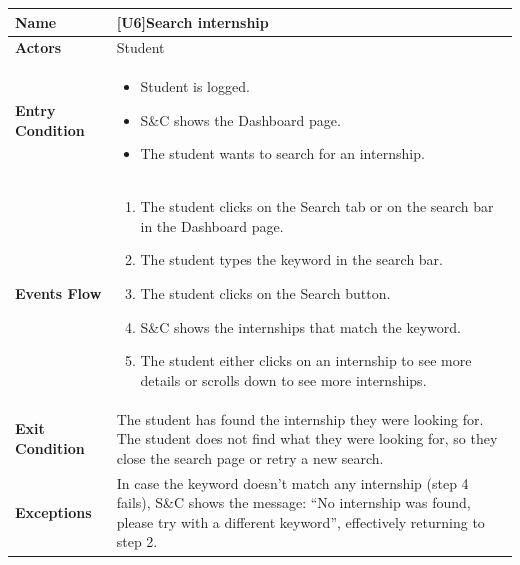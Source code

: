\begin{center}
    \begin{tabular}{|p{9em}|p{27em}|}
        \hline
        \rowcolor{bluepoli!40} %
        \textbf{Name} & \textbf{[U6]Search internship} \\
        \hline
        \textbf{Actors} & Student \\
        \hline
        \textbf{Entry Condition} &  
        \begin{itemize}
            \item Student is logged.
            \item S\&C shows the Dashboard page.
            \item The student wants to search for an internship.
        \end{itemize} \\
        \hline
        \textbf{Events Flow} & 
        \begin{enumerate}
            \item The student clicks on the Search tab or on the search bar in the Dashboard page.
            \item The student types the keyword in the search bar.
            \item The student clicks on the Search button.
            \item S\&C shows the internships that match the keyword.
            \item The student either clicks on an internship to see more details or scrolls down to see more internships.
        \end{enumerate} \\
        \hline
        \textbf{Exit Condition} & The student has found the internship they were looking for. The student does not find what they were looking for,
        so they close the search page or retry a new search. \\
        \hline
        \textbf{Exceptions} & In case the keyword doesn't match any internship (step 4 fails), S\&C shows the message: ``No internship was found,
        please try with a different keyword'', effectively returning to step 2. \\
        \hline
    \end{tabular}
\end{center}

